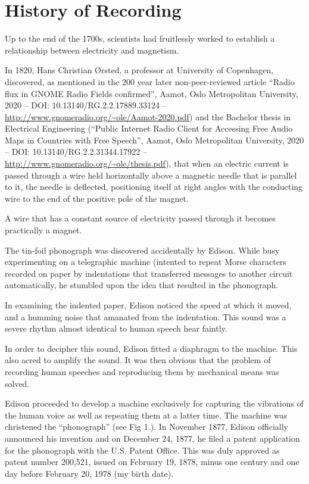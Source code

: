 \documentclass[UKenglish]{ifimaster}  %
\begin{document}
\section{History of Recording}

Up to the end of the 1700s, scientists had fruitlessly worked to
establish a relationship between electricity and magnetism.

In 1820, Hans Christian Ørsted, a professor at University of
Copenhagen, discovered, as mentioned in the 200 year later
non-peer-reviewed article ``Radio flux in GNOME Radio Fields
confirmed'', Aamot, Oslo Metropolitan University, 2020 --
DOI: 10.13140/RG.2.2.17889.33124 --
\url{http://www.gnomeradio.org/~ole/Aamot-2020.pdf}) and the Bachelor
thesis in Electrical Engineering (``Public Internet Radio Client for
Accessing Free Audio Maps in Countries with Free Speech'', Aamot, Oslo
Metropolitan University, 2020 -- DOI: 10.13140/RG.2.2.31344.17922 --
\url{http://www.gnomeradio.org/~ole/thesis.pdf}), that when an
electric current is passed through a wire held horizontally above a
magnetic needle that is parallel to it, the needle is deflected,
positioning itself at right angles with the conducting wire to the end
of the positive pole of the magnet.

A wire that has a constant source of electricity passed through it
becomes practically a magnet.

The tin-foil phonograph was discovered accidentally by Edison.  While
busy experimenting on a telegraphic machine (intented to repeat Morse
characters recorded on paper by indentations that transferred
messages to another circuit automatically, he stumbled upon the idea
that resulted in the phonograph.

In examining the indented paper, Edison noticed the speed at which it
moved, and a humming noise that amanated from the indentation.  This
sound was a severe rhythm almost identical to human speech hear
faintly.

In order to decipher this sound, Edison fitted a diaphragm to the
machine.  This also acred to amplify the sound.  It was then obvious
that the problem of recording human speeches and reproducing them by
mechanical means was solved.

Edison proceeded to develop a machine exclusively for capturing the
vibrations of the human voice as well as repeating them at a latter
time.  The machine was christened the ``phonograph'' (see Fig 1.).  In
November 1877, Edison officially announced his invention and on
December 24, 1877, he filed a patent application for the phonograph
with the U.S. Patent Office.  This was duly approved as patent number
200,521, issued on February 19, 1878, minus one century and one day
before February 20, 1978 (my birth date).
\end{document}

